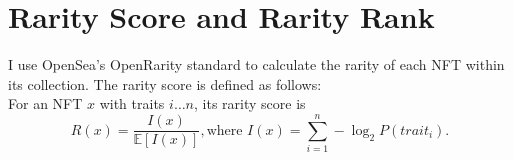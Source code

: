 \documentclass[12pt]{article}
\begin{document}




\newpage
\nocite{*}
\printbibliography

\newpage
\appendix

\section{Rarity Score and Rarity Rank}
\label{app: rarity}
I use OpenSea's OpenRarity standard to calculate the rarity of each NFT within its collection. The rarity score is defined as follows:\\
For an NFT $x$ with traits $i\dots n$, its rarity score is
\[R(x) = \frac{I(x)}{\mathbb{E}[I(x)]}, \text{where } I(x)=\sum_{i=1}^n -\log_2P(trait_i).\] 
\end{document}
